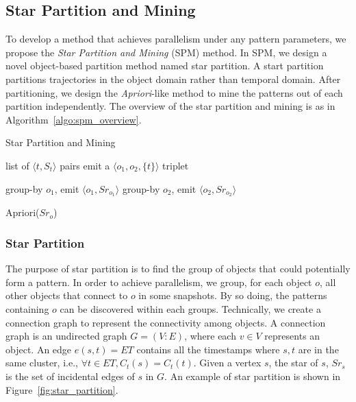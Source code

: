 \subsection{Star Partition and Mining}
To develop a method that achieves parallelism under any pattern parameters, 
we propose the \emph{Star Partition and Mining} (SPM) method. In SPM,
we design a novel object-based partition method named star partition. A start partition partitions trajectories in the object domain rather than temporal domain. After partitioning, we design the \emph{Apriori}-like 
method to mine the patterns out of each partition independently. 
The overview of the star partition and mining is as in Algorithm~\ref{algo:spm_overview}.

\begin{algorithm}
\caption{Star Partition and Mining}
\label{algo:spm_overview}
\begin{algorithmic}
\Require list of $\langle t, S_t \rangle$ pairs
		\State emit a $\langle o_1, o_2, \{t\}\rangle$ triplet
	\EndFor
\EndFor

	\State group-by $o_1$, emit $\langle o_1, Sr_{o_1} \rangle$ 
	\State group-by $o_2$, emit $\langle o_2, Sr_{o_2} \rangle$
\EndFor

\State Apriori($Sr_o$)
\EndFor

\end{algorithmic}
\end{algorithm}

\subsubsection{Star Partition}
The purpose of star partition is to find the group of objects that 
could potentially form a pattern. In order to achieve parallelism, 
we group, for each object $o$, all other objects that connect to $o$ in some snapshots. By so doing, the patterns containing $o$ can be discovered within each groups. 
Technically, we create a connection graph to represent the
connectivity among objects. A connection graph is an undirected graph $G=(V:E)$, where 
each $v \in V$ represents an object. An edge $e(s,t)= ET$ 
contains all the timestamps where $s,t$ are in the same cluster,
i.e., $\forall t \in ET, C_t(s) = C_t(t)$. 
Given a vertex $s$, the star of $s$, $Sr_s$ is the set of incidental edges of $s$ in $G$. An example of star partition is shown in Figure~\ref{fig:star_partition}.

